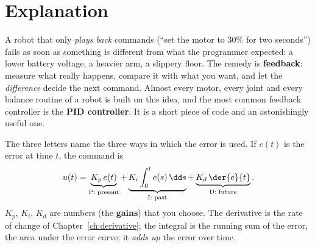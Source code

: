 \label{ch:ctl1}

\section*{Explanation}
A robot that only \emph{plays back} commands (``set the motor to $30\%$ for two seconds'') fails as soon as something is different from what the programmer expected: a lower battery voltage, a heavier arm, a slippery floor. The remedy is \textbf{feedback}: measure what really happens, compare it with what you want, and let the \emph{difference} decide the next command. Almost every motor, every joint and every balance routine of a robot is built on this idea, and the most common feedback controller is the \textbf{PID controller}. It is a short piece of code and an astonishingly useful one.

\begin{center}
\end{center}

The three letters name the three ways in which the error is used. If $e(t)$ is the error at time $t$, the command is
\[
u(t)=\underbrace{K_p\,e(t)}_{\text{P: present}}+\underbrace{K_i\int_0^t e(s)\,\dd s}_{\text{I: past}}+\underbrace{K_d\,\der{e}{t}}_{\text{D: future}} .
\]
$K_p$, $K_i$, $K_d$ are numbers (the \textbf{gains}) that you choose. The derivative is the rate of change of Chapter~\ref{ch:derivative}; the integral is the running sum of the error, the area under the error curve: it \emph{adds up} the error over time.

